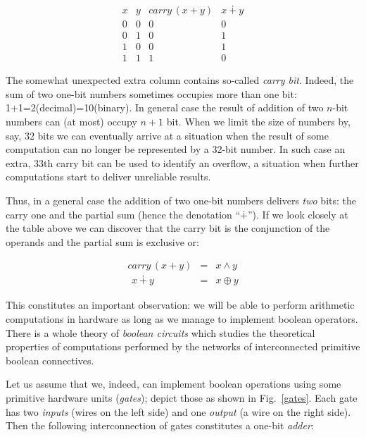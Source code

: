 \[
\begin{array}{cc||c|c}
  x & y & carry\,(x + y) & x\dotplus y \\
  \hline
  0 & 0 & 0 & 0   \\
  0 & 1 & 0 & 1   \\ 
  1 & 0 & 0 & 1   \\
  1 & 1 & 1 & 0 
\end{array}
\]

The somewhat unexpected extra column contains so-called \emph{carry bit}. Indeed, the sum of two one-bit numbers sometimes occupies
more than one bit: 1+1=2(decimal)=10(binary). In general case the result of addition of two $n$-bit numbers can (at most) occupy
$n+1$ bit. When we limit the size of numbers by, say, 32 bits we can eventually arrive at a situation when the result of some
computation can no longer be represented by a 32-bit number. In such case an extra, 33th carry bit can be used to
identify an overflow, a situation when further computations start to deliver unreliable results.

Thus, in a general case the addition of two one-bit numbers delivers \emph{two} bits: the carry one and the partial sum (hence the
denotation ``$\dotplus$'').
If we look closely at the table above we can discover that the carry bit is the conjunction of the operands and the partial
sum is exclusive or:

\[
\begin{array}{rcl}
  carry\,(x + y) & = & x\wedge y\\
  \phantom{(}x\dotplus y\phantom{)} & = & x\oplus y
\end{array}
\]

This constitutes an important observation: we will be able to perform arithmetic computations in hardware as long as we manage to implement
boolean operators. There is a whole theory of \emph{boolean circuits} which studies the theoretical properties of computations
performed by the networks of interconnected primitive boolean connectives.

Let us assume that we, indeed, can implement boolean operations using some primitive hardware units (\emph{gates}); depict those as
shown in Fig.~\ref{gates}. Each gate has two \emph{inputs} (wires on the left side) and one \emph{output} (a wire on the right side). 
Then the following interconnection of gates constitutes a one-bit \emph{adder}:
 
